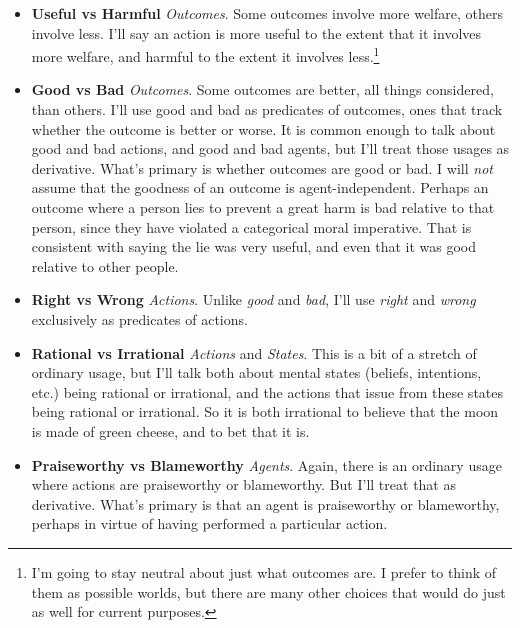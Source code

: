 \documentclass[
  10pt,
  letterpaper,
  twoside]{scrbook}
\providecommand{\tightlist}{%
  \setlength{\itemsep}{0pt}\setlength{\parskip}{0pt}}\usepackage{longtable,booktabs,array}
\begin{document}
\begin{itemize}
\tightlist
\item
  \textbf{Useful vs Harmful} \emph{Outcomes}. Some outcomes involve more
  welfare, others involve less. I'll say an action is more useful to the
  extent that it involves more welfare, and harmful to the extent it
  involves less.\footnote{I'm going to stay neutral about just what
    outcomes are. I prefer to think of them as possible worlds, but
    there are many other choices that would do just as well for current
    purposes.}
\item
  \textbf{Good vs Bad} \emph{Outcomes}. Some outcomes are better, all
  things considered, than others. I'll use good and bad as predicates of
  outcomes, ones that track whether the outcome is better or worse. It
  is common enough to talk about good and bad actions, and good and bad
  agents, but I'll treat those usages as derivative. What's primary is
  whether outcomes are good or bad. I will \emph{not} assume that the
  goodness of an outcome is agent-independent. Perhaps an outcome where
  a person lies to prevent a great harm is bad relative to that person,
  since they have violated a categorical moral imperative. That is
  consistent with saying the lie was very useful, and even that it was
  good relative to other people.
\item
  \textbf{Right vs Wrong} \emph{Actions}. Unlike \emph{good} and
  \emph{bad}, I'll use \emph{right} and \emph{wrong} exclusively as
  predicates of actions.
\item
  \textbf{Rational vs Irrational} \emph{Actions} and \emph{States}. This
  is a bit of a stretch of ordinary usage, but I'll talk both about
  mental states (beliefs, intentions, etc.) being rational or
  irrational, and the actions that issue from these states being
  rational or irrational. So it is both irrational to believe that the
  moon is made of green cheese, and to bet that it is.
\item
  \textbf{Praiseworthy vs Blameworthy} \emph{Agents}. Again, there is an
  ordinary usage where actions are praiseworthy or blameworthy. But I'll
  treat that as derivative. What's primary is that an agent is
  praiseworthy or blameworthy, perhaps in virtue of having performed a
  particular action.
\end{itemize}
\end{document}
